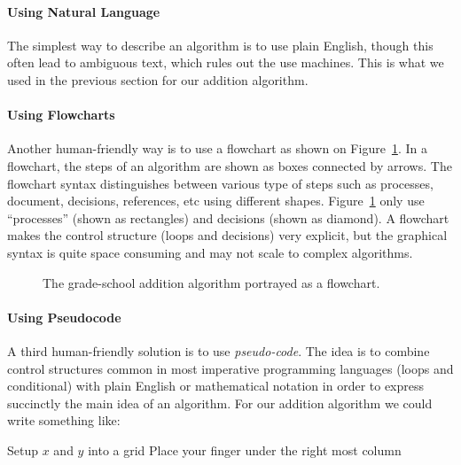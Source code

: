 \documentclass{aldast}
\begin{document}
\paragraph{Using Natural Language}
The simplest way to describe an algorithm is to use plain English,
though this often lead to ambiguous text, which rules out the use
machines. This is what we used in the previous section for our
addition algorithm.

\paragraph{Using Flowcharts} Another human-friendly way is to use a
flowchart as shown on Figure~\ref{fig:flowchart}. In a flowchart, the
steps of an algorithm are shown as boxes connected by arrows. The
flowchart syntax distinguishes between various type of steps such as
processes, document, decisions, references, etc using different
shapes. Figure~\ref{fig:flowchart} only use ``processes'' (shown as
rectangles) and decisions (shown as diamond). A flowchart makes the
control structure (loops and decisions) very explicit, but the
graphical syntax is quite space consuming and may not scale to complex
algorithms.

\begin{figure}[htbp]
  \begin{center}
    
  \end{center}
  \caption{The grade-school addition algorithm portrayed as a
    flowchart.}
  \label{fig:flowchart}
\end{figure}

\paragraph{Using Pseudocode} A third human-friendly solution is to use
\emph{pseudo-code}. The idea is to combine control structures common
in most imperative programming languages (loops and conditional) with
plain English or mathematical notation in order to express succinctly
the main idea of an algorithm. For our addition algorithm
we could write something like:
\begin{algorithm}
  Setup $x$ and $y$ into a grid \;
  Place your finger under the right most column\;
  \;
\end{algorithm}
\end{document}
